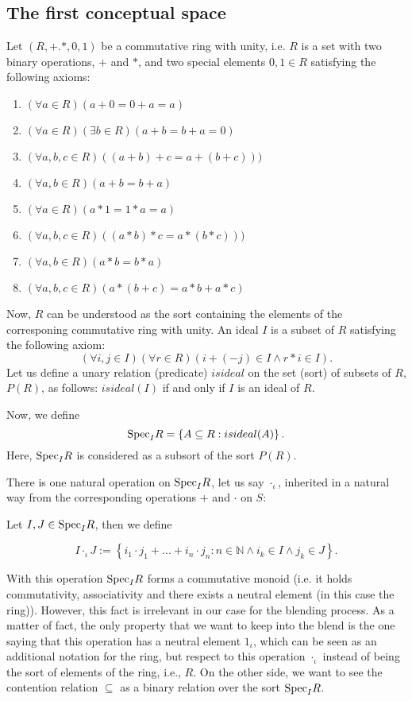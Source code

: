\subsection{The first conceptual space}
Let $(R,+.*,0,1)$ be a commutative ring with unity, i.e. $R$ is a set with two binary operations, $+$ and $*$, and two special elements $0,1\in R$ satisfying the following axioms:
\begin{enumerate}
\item $(\forall a\in R)(a+0=0+a=a)$
\item $(\forall a\in R)(\exists b\in R)(a+b=b+a=0)$
\item $(\forall a,b,c \in R)((a+b)+c=a+(b+c)))$
\item $(\forall a,b \in R)(a+b=b+a)$
\item $(\forall a\in R)(a*1=1*a=a)$
\item $(\forall a,b,c \in R)((a*b)*c=a*(b*c)))$
\item $(\forall a,b \in R)(a*b=b*a)$
\item $(\forall a,b,c \in R)(a*(b+c)=a*b+a*c)$
\end{enumerate}
Now, $R$ can be understood as the sort containing the elements of the corresponing commutative ring with unity.
An ideal $I$ is a subset of $R$ satisfying the following axiom:
\[(\forall i,j\in I)(\forall r\in R)(i+(-j)\in I \wedge r*i\in I).\]
\newline\indent 
Let us define a unary relation (predicate) $isideal$ on the set (sort) of subsets of $R$, $P(R)$, as follows:
$isideal(I)$ if and only if $I$ is an ideal of $R$.

Now, we define
\[{\rm Spec}_IR=\left\{A\subseteq R: isideal(A) \right\}.\]
Here, ${\rm Spec}_IR$ is considered as a subsort of the sort $P(R)$.

There is one natural operation on ${\rm Spec}_IR$, let us say
$\cdot_{\iota}$, inherited in a natural way from the corresponding
operations $+$ and $\cdot$ on $S$:

 Let $I,J\in {\rm Spec}_IR$, then we define 

\[I\cdot_{\iota} J:=\left\{i_1\cdot j_1+...+i_n\cdot j_n:n \in \mathbb{N} \wedge i_k\in I \wedge j_k\in J \right\}.\]

With this operation ${\rm Spec}_IR$ forms a commutative monoid
(i.e. it holds commutativity, associativity and there exists a neutral
element (in this case the ring)). However, this fact is irrelevant in
our case for the blending process. As a matter of fact, the only
property that we want to keep into the blend is the one saying that
this operation has a neutral element $1_{\iota}$, which can be seen as
an additional notation for the ring, but respect to this operation
$\cdot_{\iota}$ instead of being the sort of elements of the ring,
i.e., $R$.  \newline\indent On the other side, we want to see the
contention relation $\subseteq$ as a binary relation over the sort
${\rm Spec}_IR$.

